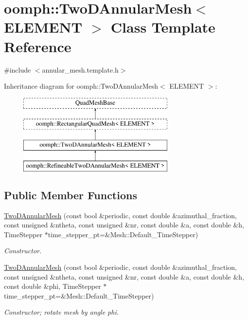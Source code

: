 \hypertarget{classoomph_1_1TwoDAnnularMesh}{}\section{oomph\+:\+:Two\+D\+Annular\+Mesh$<$ E\+L\+E\+M\+E\+NT $>$ Class Template Reference}
\label{classoomph_1_1TwoDAnnularMesh}


{\ttfamily \#include $<$annular\+\_\+mesh.\+template.\+h$>$}

Inheritance diagram for oomph\+:\+:Two\+D\+Annular\+Mesh$<$ E\+L\+E\+M\+E\+NT $>$\+:\begin{figure}[H]
\begin{center}
\leavevmode
\includegraphics[height=4.000000cm]{classoomph_1_1TwoDAnnularMesh}
\end{center}
\end{figure}
\subsection*{Public Member Functions}
\begin{DoxyCompactItemize}
\item 
\hyperlink{classoomph_1_1TwoDAnnularMesh_a4bb40bf0a81db8dc3493735007626c3b}{Two\+D\+Annular\+Mesh} (const bool \&periodic, const double \&azimuthal\+\_\+fraction, const unsigned \&ntheta, const unsigned \&nr, const double \&a, const double \&h, Time\+Stepper $\ast$time\+\_\+stepper\+\_\+pt=\&Mesh\+::\+Default\+\_\+\+Time\+Stepper)
\begin{DoxyCompactList}\small\item\em Constructor. \end{DoxyCompactList}\item 
\hyperlink{classoomph_1_1TwoDAnnularMesh_a2d67eba43c6355893c7a95208068d387}{Two\+D\+Annular\+Mesh} (const bool \&periodic, const double \&azimuthal\+\_\+fraction, const unsigned \&ntheta, const unsigned \&nr, const double \&a, const double \&h, const double \&phi, Time\+Stepper $\ast$time\+\_\+stepper\+\_\+pt=\&Mesh\+::\+Default\+\_\+\+Time\+Stepper)
\begin{DoxyCompactList}\small\item\em Constructor; rotate mesh by angle phi. \end{DoxyCompactList}\end{DoxyCompactItemize}
